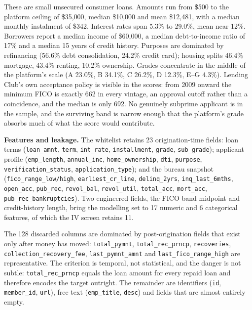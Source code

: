 \documentclass[a4paper,twocolumn,10pt]{article}
\begin{document}
These are small unsecured consumer loans. Amounts run from \$500 to the platform ceiling of \$35{,}000, median \$10{,}000 and mean \$12{,}481, with a median monthly instalment of \$342. Interest rates span 5.3\% to 29.0\%, mean near 12\%. Borrowers report a median income of \$60{,}000, a median debt-to-income ratio of 17\% and a median 15 years of credit history. Purposes are dominated by refinancing (56.6\% debt consolidation, 24.2\% credit card); housing splits 46.4\% mortgage, 43.4\% renting, 10.2\% ownership. Grades concentrate in the middle of the platform's scale (A 23.0\%, B 34.1\%, C 26.2\%, D 12.3\%, E--G 4.3\%). Lending Club's own acceptance policy is visible in the scores: from 2009 onward the minimum FICO is exactly 662 in every vintage, an approval cutoff rather than a coincidence, and the median is only 692. No genuinely subprime applicant is in the sample, and the surviving band is narrow enough that the platform's grade absorbs much of what the score would contribute.

\textbf{Features and leakage.} The whitelist retains 23 origination-time fields: loan terms (\texttt{loan\_amnt}, \texttt{term}, \texttt{int\_rate}, \texttt{installment}, \texttt{grade}, \texttt{sub\_grade}); applicant profile (\texttt{emp\_length}, \texttt{annual\_inc}, \texttt{home\_ownership}, \texttt{dti}, \texttt{purpose}, \texttt{verification\_status}, \texttt{application\_type}); and the bureau snapshot (\texttt{fico\_range\_low/high}, \texttt{earliest\_cr\_line}, \texttt{delinq\_2yrs}, \texttt{inq\_last\_6mths}, \texttt{open\_acc}, \texttt{pub\_rec}, \texttt{revol\_bal}, \texttt{revol\_util}, \texttt{total\_acc}, \texttt{mort\_acc}, \texttt{pub\_rec\_bankruptcies}). Two engineered fields, the FICO band midpoint and credit-history length, bring the modelling set to 17 numeric and 6 categorical features, of which the IV screen retains 11.

The 128 discarded columns are dominated by post-origination fields that exist only after money has moved: \texttt{total\_pymnt}, \texttt{total\_rec\_prncp}, \texttt{recoveries}, \texttt{collection\_recovery\_fee}, \texttt{last\_pymnt\_amnt} and \texttt{last\_fico\_range\_high} are representative. The criterion is temporal, not statistical, and the danger is not subtle: \texttt{total\_rec\_prncp} equals the loan amount for every repaid loan and therefore encodes the target outright. The remainder are identifiers (\texttt{id}, \texttt{member\_id}, \texttt{url}), free text (\texttt{emp\_title}, \texttt{desc}) and fields that are almost entirely empty.
\end{document}
